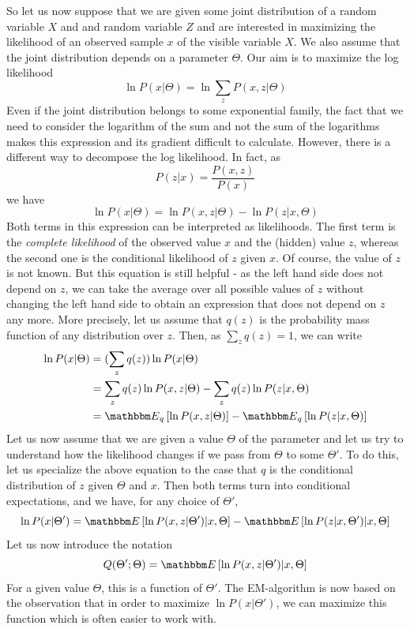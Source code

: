 \documentclass[a4paper, draft]{article}
\theoremstyle{own}
\theoremstyle{remark}
\begin{document}
So let us now suppose that we are given some joint distribution of a random variable $X$ and and random variable $Z$ and are interested in maximizing the likelihood of an observed sample $x$ of the visible variable $X$. We also assume that the joint distribution depends on a parameter $\Theta$. Our aim is to maximize the log likelihood
$$
\ln P(x |\Theta) = \ln \sum_z P(x,z | \Theta)
$$
Even if the joint distribution belongs to some exponential family, the fact that we need to consider the logarithm of the sum and not the sum of the logarithms makes this expression and its gradient difficult to calculate. However, there is a different way to decompose the log likelihood. In fact, as
$$
P(z | x) = \frac{P(x,z)}{P(x)}
$$
we have
$$
\ln P(x | \Theta) = \ln P(x,z | \Theta) - \ln P(z | x,\Theta)
$$
Both terms in this expression can be interpreted as likelihoods. The first term is the {\em complete likelihood} of the observed value $x$ and the (hidden) value $z$, whereas the second one is the conditional likelihood of $z$ given $x$. Of course, the value of $z$ is not known. But this equation is still helpful - as the left hand side does not depend on $z$, we can take the average over all possible values of $z$ without changing the left hand side to obtain an expression that does not depend on $z$ any more. More precisely, let us assume that $q(z)$ is the probability mass function of any distribution over $z$. Then, as $\sum_z q(z) = 1$, we can write
\begin{align*}
\ln P(x | \Theta) &=  (\sum_z q(z)) \ln P(x | \Theta) \\ 
&= \sum_z q(z) \ln P(x,z | \Theta) - \sum_z q(z) \ln P(z | x, \Theta) \\
&= {\mathbbm E}_q \left[ \ln P(x,z | \Theta) \right] - 
{\mathbbm E}_q \left[  \ln P(z | x, \Theta)    \right]
\end{align*}
Let us now assume that we are given a value $\Theta$ of the parameter and let us try to understand how the likelihood changes if we pass from $\Theta$ to 
some $\Theta'$. To do this, let us specialize the above equation to the case that $q$ is the conditional distribution of $z$ given $\Theta$ and $x$. Then both terms turn into conditional expectations, and we have, for any choice of $\Theta'$,
$$
\ln P(x | \Theta') = 
{\mathbbm E} \left[  \ln P(x,z | \Theta')  | x, \Theta   \right]
-
{\mathbbm E} \left[  \ln P(z | x,\Theta') | x, \Theta      \right]
$$
Let us now introduce the notation
$$
Q(\Theta'; \Theta) = {\mathbbm E} \left[  \ln P(x,z | \Theta')  | x, \Theta \right]
$$
For a given value $\Theta$, this is a function of $\Theta'$. The EM-algorithm is now based on the observation that in order to maximize $\ln P(x | \Theta')$, we can maximize this function which is often easier to work with.
\end{document}
